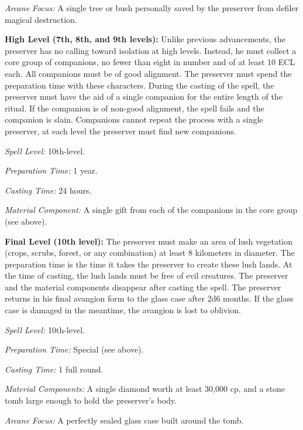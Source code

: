 {\textit{Arcane Focus:} A single tree or bush personally saved by the preserver from defiler magical destruction.

\textbf{High Level (7th, 8th, and 9th levels):} Unlike previous advancements, the preserver has no calling toward isolation at high levels. Instead, he must collect a core group of companions, no fewer than eight in number and of at least 10 ECL each. All companions must be of good alignment. The preserver must spend the preparation time with these characters. During the casting of the spell, the preserver must have the aid of a single companion for the entire length of the ritual. If the companion is of non-good alignment, the spell fails and the companion is slain. Companions cannot repeat the process with a single preserver, at each level the preserver must find new companions.

\textit{Spell Level:} 10th-level.

\textit{Preparation Time:} 1 year.

\textit{Casting Time:} 24 hours.

\textit{Material Component:} A single gift from each of the companions in the core group (see above).

\textbf{Final Level (10th level):} The preserver must make an area of lush vegetation (crops, scrubs, forest, or any combination) at least 8 kilometers in diameter. The preparation time is the time it takes the preserver to create these lush lands. At the time of casting, the lush lands must be free of evil creatures. The preserver and the material components disappear after casting the spell. The preserver returns in his final avangion form to the glass case after 2d6 months. If the glass case is damaged in the meantime, the avangion is lost to oblivion.

\textit{Spell Level:} 10th-level.

\textit{Preparation Time:} Special (see above).

\textit{Casting Time:} 1 full round.

\textit{Material Components:} A single diamond worth at least 30,000 cp, and a stone tomb large enough to hold the preserver's body.

\textit{Arcane Focus:} A perfectly sealed glass case built around the tomb.
}

